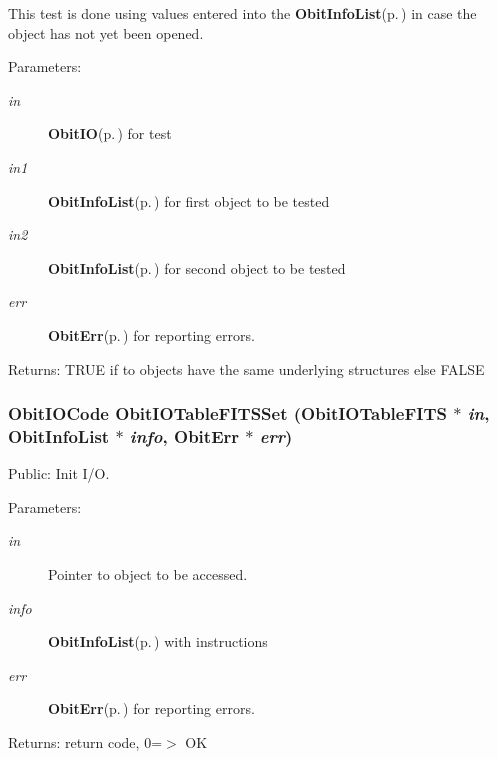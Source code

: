 This test is done using values entered into the {\bf Obit\-Info\-List}{\rm (p.\,\pageref{structObitInfoList})} in case the object has not yet been opened. \begin{Desc}
\item[Parameters:]
\begin{description}
\item[{\em in}]{\bf Obit\-IO}{\rm (p.\,\pageref{structObitIO})} for test \item[{\em in1}]{\bf Obit\-Info\-List}{\rm (p.\,\pageref{structObitInfoList})} for first object to be tested \item[{\em in2}]{\bf Obit\-Info\-List}{\rm (p.\,\pageref{structObitInfoList})} for second object to be tested \item[{\em err}]{\bf Obit\-Err}{\rm (p.\,\pageref{structObitErr})} for reporting errors. \end{description}
\end{Desc}
\begin{Desc}
\item[Returns:]TRUE if to objects have the same underlying structures else FALSE \end{Desc}
\subsubsection{\setlength{\rightskip}{0pt plus 5cm}Obit\-IOCode Obit\-IOTable\-FITSSet ({\bf Obit\-IOTable\-FITS} $\ast$ {\em in}, {\bf Obit\-Info\-List} $\ast$ {\em info}, {\bf Obit\-Err} $\ast$ {\em err})}\label{ObitIOTableFITS_8h_a11}


Public: Init I/O. 

\begin{Desc}
\item[Parameters:]
\begin{description}
\item[{\em in}]Pointer to object to be accessed. \item[{\em info}]{\bf Obit\-Info\-List}{\rm (p.\,\pageref{structObitInfoList})} with instructions \item[{\em err}]{\bf Obit\-Err}{\rm (p.\,\pageref{structObitErr})} for reporting errors. \end{description}
\end{Desc}
\begin{Desc}
\item[Returns:]return code, 0=$>$ OK \end{Desc}
